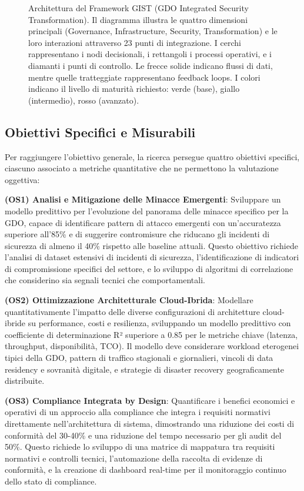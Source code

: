 \begin{figure}[htbp]
{{\vspace{5cm}
}}
\caption{Architettura del Framework GIST (GDO Integrated Security Transformation). Il diagramma illustra le quattro dimensioni principali (Governance, Infrastructure, Security, Transformation) e le loro interazioni attraverso 23 punti di integrazione. I cerchi rappresentano i nodi decisionali, i rettangoli i processi operativi, e i diamanti i punti di controllo. Le frecce solide indicano flussi di dati, mentre quelle tratteggiate rappresentano feedback loops. I colori indicano il livello di maturità richiesto: verde (base), giallo (intermedio), rosso (avanzato).}
\label{fig:gist_framework_detail}
\end{figure}

\subsection{Obiettivi Specifici e Misurabili}

Per raggiungere l'obiettivo generale, la ricerca persegue quattro obiettivi specifici, ciascuno associato a metriche quantitative che ne permettono la valutazione oggettiva:

\textbf{(OS1) Analisi e Mitigazione delle Minacce Emergenti}: Sviluppare un modello predittivo per l'evoluzione del panorama delle minacce specifico per la GDO, capace di identificare pattern di attacco emergenti con un'accuratezza superiore all'85\% e di suggerire contromisure che riducano gli incidenti di sicurezza di almeno il 40\% rispetto alle baseline attuali. Questo obiettivo richiede l'analisi di dataset estensivi di incidenti di sicurezza, l'identificazione di indicatori di compromissione specifici del settore, e lo sviluppo di algoritmi di correlazione che considerino sia segnali tecnici che comportamentali.

\textbf{(OS2) Ottimizzazione Architetturale Cloud-Ibrida}: Modellare quantitativamente l'impatto delle diverse configurazioni di architetture cloud-ibride su performance, costi e resilienza, sviluppando un modello predittivo con coefficiente di determinazione R² superiore a 0.85 per le metriche chiave (latenza, throughput, disponibilità, TCO). Il modello deve considerare workload eterogenei tipici della GDO, pattern di traffico stagionali e giornalieri, vincoli di data residency e sovranità digitale, e strategie di disaster recovery geograficamente distribuite.

\textbf{(OS3) Compliance Integrata by Design}: Quantificare i benefici economici e operativi di un approccio alla compliance che integra i requisiti normativi direttamente nell'architettura di sistema, dimostrando una riduzione dei costi di conformità del 30-40\% e una riduzione del tempo necessario per gli audit del 50\%. Questo richiede lo sviluppo di una matrice di mappatura tra requisiti normativi e controlli tecnici, l'automazione della raccolta di evidenze di conformità, e la creazione di dashboard real-time per il monitoraggio continuo dello stato di compliance.

